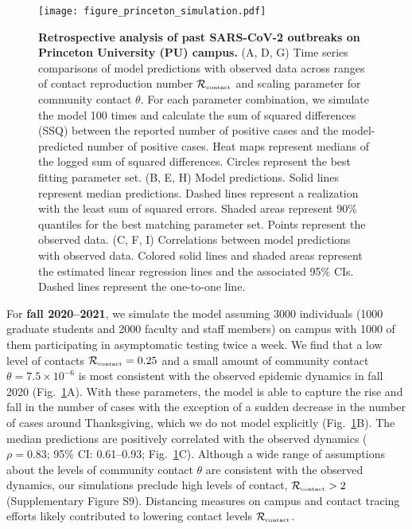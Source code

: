 \documentclass[12pt]{article}
\newcommand{\fref}[1]{Fig.~\ref{fig:#1}}
\newcommand{\Rx}[1]{\ensuremath{{\mathcal R}_{#1}}}
\newcommand{\Rc}{\Rx{\textrm{\tiny{contact}}}}
\begin{document}
\begin{figure}[!th]
\texttt{[image: figure\_princeton\_simulation.pdf]}
\caption{
\textbf{Retrospective analysis of past SARS-CoV-2 outbreaks on Princeton University (PU) campus.}
(A, D, G) Time series comparisons of model predictions with observed data across ranges of contact reproduction number $\Rc$ and scaling parameter for community contact $\theta$.
For each parameter combination, we simulate the model 100 times and calculate the sum of squared differences (SSQ) between the reported number of positive cases and the model-predicted number of positive cases. 
Heat maps represent medians of the logged sum of squared differences.
Circles represent the best fitting parameter set.
(B, E, H) Model predictions. 
Solid lines represent median predictions.
Dashed lines represent a realization with the least sum of squared errors.
Shaded areas represent 90\% quantiles for the best matching parameter set.
Points represent the observed data.
(C, F, I) Correlations between model predictions with observed data.
Colored solid lines and shaded areas represent the estimated linear regression lines and the associated 95\% CIs.
Dashed lines represent the one-to-one line.
\label{fig:matching}
}
\end{figure}

For \textbf{fall 2020--2021}, we simulate the model assuming 3000 individuals (1000 graduate students and 2000 faculty and staff members) on campus with 1000 of them participating in asymptomatic testing twice a week.
We find that a low level of contacts $\Rc=0.25$ and a small amount of community contact $\theta=7.5\times 10^{-6}$ is most consistent with the observed epidemic dynamics in fall 2020 (\fref{matching}A).
With these parameters, the model is able to capture the rise and fall in the number of cases with the exception of a sudden decrease in the number of cases around Thanksgiving, which we do not model explicitly (\fref{matching}B).
The median predictions are positively correlated with the observed dynamics ($\rho = 0.83$; 95\% CI: 0.61--0.93; \fref{matching}C).
Although a wide range of assumptions about the levels of community contact $\theta$ are consistent with the observed dynamics, our simulations preclude high levels of contact, $\Rc > 2$ (Supplementary Figure S9).
Distancing measures on campus and contact tracing efforts likely contributed to lowering contact levels $\Rc$.
\end{document}

